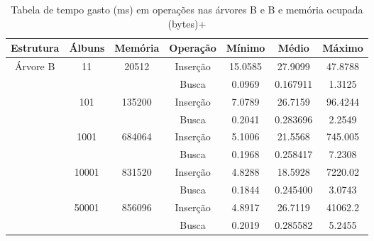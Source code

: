 \documentclass[12pt]{article}
\begin{document}
\begin{table}[ht]
\centering
\caption{Tabela de tempo gasto (ms) em operações nas árvores B e B e memória ocupada (bytes)\nolinebreak+}
\label{tab:resultados}
\begin{tabular}{|c|c|c|c|c|c|c|}
\hline
  Estrutura & Álbuns & Memória & Operação & Mínimo & Médio & Máximo \\ \hline
  \multirow{11}{*}{Árvore B} & \multirow{2}{*}{11} & \multirow{2}{*}{20512} & Inserção & 15.0585 & 27.9099 & 47.8788 \\
                            & & & Busca    & 0.0969 & 0.167911 & 1.3125	 \\
                  \cline{2-7} &  \multirow{2}{*}{101} & \multirow{2}{*}{135200} & Inserção & 7.0789 & 26.7159 & 96.4244\\
                            & & & Busca    & 0.2041 & 0.283696 & 2.2549	 \\
                  \cline{2-7} &  \multirow{2}{*}{1001} & \multirow{2}{*}{684064} & Inserção & 5.1006 & 21.5568 & 745.005 \\
                            & & & Busca    & 0.1968 & 0.258417 & 7.2308	 \\
                  \cline{2-7} &  \multirow{2}{*}{10001} & \multirow{2}{*}{831520} & Inserção & 4.8288 & 18.5928 & 7220.02  \\
                            & & & Busca    & 0.1844 & 0.245400 & 3.0743	\\
                  \cline{2-7} &  \multirow{2}{*}{50001} & \multirow{2}{*}{856096} & Inserção & 4.8917 & 26.7119 & 41062.2\\
                            & & & Busca    & 0.2019 & 0.285582 & 5.2455	 \\
  \hline


\end{tabular}
\end{table}
\end{document}

